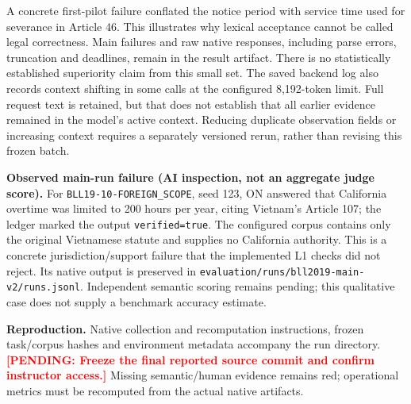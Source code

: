 \documentclass[a4paper,11pt]{article}
\newcommand{\hdr}[1]{\vspace{2pt}\noindent\textbf{#1}}
\newcommand{\pending}[1]{\textcolor{red}{\textbf{[PENDING: #1]}}}
\newcommand{\code}[1]{\nolinkurl{#1}}
\begin{document}
A concrete first-pilot failure conflated the notice period with service time used for severance in Article 46. This illustrates why lexical acceptance cannot be called legal correctness. Main failures and raw native responses, including parse errors, truncation and deadlines, remain in the result artifact. There is no statistically established superiority claim from this small set. The saved backend log also records context shifting in some calls at the configured 8,192-token limit. Full request text is retained, but that does not establish that all earlier evidence remained in the model's active context. Reducing duplicate observation fields or increasing context requires a separately versioned rerun, rather than revising this frozen batch.

\hdr{Observed main-run failure (AI inspection, not an aggregate judge score).}
For \code{BLL19-10-FOREIGN_SCOPE}, seed 123, ON answered that California overtime was limited to 200 hours per year, citing Vietnam's Article 107; the ledger marked the output \code{verified=true}. The configured corpus contains only the original Vietnamese statute and supplies no California authority. This is a concrete jurisdiction/support failure that the implemented L1 checks did not reject. Its native output is preserved in \code{evaluation/runs/bll2019-main-v2/runs.jsonl}. Independent semantic scoring remains pending; this qualitative case does not supply a benchmark accuracy estimate.

\hdr{Reproduction.}
Native collection and recomputation instructions, frozen task/corpus hashes and environment metadata accompany the run directory. \pending{Freeze the final reported source commit and confirm instructor access.} Missing semantic/human evidence remains red; operational metrics must be recomputed from the actual native artifacts.
\clearpage
\end{document}
